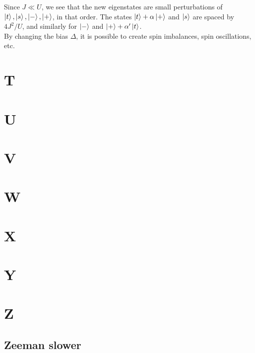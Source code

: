 \documentclass{book}
\theoremstyle{definition}
\newcommand{\al}{\alpha}
\begin{document}
Since $J \ll U$, we see that the new eigenstates are small perturbations of $\ket{t},\ket{s},\ket{-},\ket{+}$, in that order. The states $\ket{t}+\al\ket{+}$ and $\ket{s}$ are spaced by $4J^2/U$, and similarly for $\ket{-}$ and $\ket{+}+ \al'\ket{t}$.  \\



By changing the bias $\Delta$, it is possible to create spin imbalances, spin oscillations, etc. 











\chapter*{T}
\chapter*{U}
\chapter*{V}
\chapter*{W}
\chapter*{X}
\chapter*{Y}
\chapter*{Z}



\section*{Zeeman slower}






\newpage

 

\end{document}
